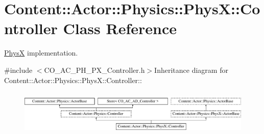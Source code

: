 \hypertarget{classContent_1_1Actor_1_1Physics_1_1PhysX_1_1Controller}{
\section{Content::Actor::Physics::PhysX::Controller Class Reference}
\label{classContent_1_1Actor_1_1Physics_1_1PhysX_1_1Controller}
}


\hyperlink{namespaceContent_1_1Actor_1_1Physics_1_1PhysX}{PhysX} implementation.  


{\ttfamily \#include $<$CO\_\-AC\_\-PH\_\-PX\_\-Controller.h$>$}Inheritance diagram for Content::Actor::Physics::PhysX::Controller::\begin{figure}[H]
\begin{center}
\leavevmode
\includegraphics[height=2.17054cm]{classContent_1_1Actor_1_1Physics_1_1PhysX_1_1Controller}
\end{center}
\end{figure}
